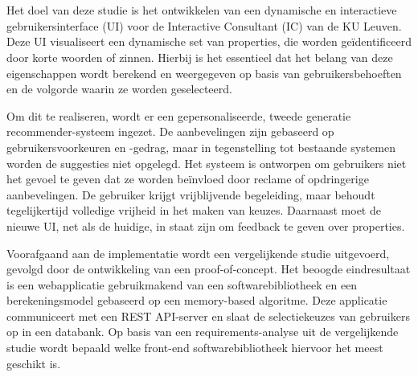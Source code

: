 

\section{}%
\label{sec:onderzoeksdoelstelling}
Het doel van deze studie is het ontwikkelen van een dynamische en interactieve gebruikersinterface (UI) voor de Interactive Consultant (IC) van de KU Leuven. Deze UI visualiseert een dynamische set van properties, die worden geïdentificeerd door korte woorden of zinnen. Hierbij is het essentieel dat het belang van deze eigenschappen wordt berekend en weergegeven op basis van gebruikersbehoeften en de volgorde waarin ze worden geselecteerd.\smallskip\par Om dit te realiseren, wordt er een gepersonaliseerde, tweede generatie recomm\-ender-systeem ingezet. De aanbevelingen zijn gebaseerd op gebruikersvoorkeuren en -gedrag, maar in tegenstelling tot bestaande systemen worden de suggesties niet opgelegd. Het systeem is ontworpen om gebruikers niet het gevoel te geven dat ze worden beïnvloed door reclame of opdringerige aanbevelingen. De gebruiker krijgt vrijblijvende begeleiding, maar behoudt tegelijkertijd volledige vrijheid in het maken van keuzes. Daarnaast moet de nieuwe UI, net als de huidige, in staat zijn om feedback te geven over properties.\smallskip\par  Voorafgaand aan de implementatie wordt een vergelijkende studie uitgevoerd, gevolgd door de ontwikkeling van een proof-of-concept. Het beoogde eindresultaat is een webapplicatie gebruikmakend van een softwarebibliotheek en een berekeningsmodel gebaseerd op een memory-based algoritme. Deze applicatie communiceert met een REST API-server en slaat de selectiekeuzes van gebruikers op in een databank. Op basis van een requirements-analyse uit de vergelijkende studie wordt bepaald welke front-end softwarebibliotheek hiervoor het meest geschikt is.


